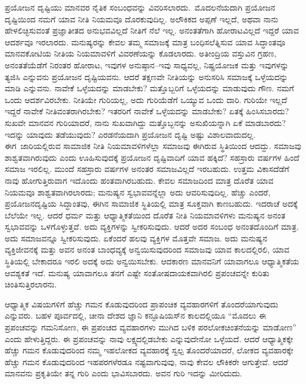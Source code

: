\vskip  0.2cm

ಪ್ರಯೋಜನ ದೃಷ್ಟಿಯು ಮಾನವರ ನೈತಿಕ ಸಂಬಂಧವನ್ನು ವಿವರಿಸಲಾರದು.\break\ ಮೊದಲನೆಯದಾಗಿ ಪ್ರಯೋಜನ ದೃಷ್ಟಿಯಿಂದ ನಮಗೆ ಯಾವ ನೀತಿ ನಿಯಮವೂ ದೊರಕುವುದಿಲ್ಲ. ಅಲೌಕಿಕದ ಅಪ್ಪಣೆ ಇಲ್ಲದೆ, ಅಥವಾ ನಾನು ಹೇಳಲಿಚ್ಛಿಸುವಂತೆ ಪ್ರಜ್ಞಾತೀತದ ಅನುಭವವಿಲ್ಲದೆ ನೀತಿಗೆ ನೆಲೆ ಇಲ್ಲ. ಅನಂತತೆಗಾಗಿ ಹೋರಾಟವಿಲ್ಲದೆ ಇದ್ದರೆ ಯಾವ ಆದರ್ಶವೂ ಇರಲಾರದು. ಮನುಷ್ಯರನ್ನು ಕೇವಲ ತಮ್ಮ ಸಮಾಜಕ್ಕೆ ಮಾತ್ರ ಬಂಧಿಸಲೆತ್ನಿಸುವ ಯಾವ ಸಿದ್ಧಾಂತವೂ ಮಾನವಕೋಟಿಯ ನೀತಿಯ ನಿಯಮಾವಳಿಗೆ ವಿವರಣೆಯನ್ನು ಕೊಡಲಾರದು. ಅತೀಂದ್ರಿಯ ವಸ್ತುವಿನ ಗ್ರಹಣ, ಅನಂತತೆಯೆಡೆಗೆ ನಿರಂತರ ಹೋರಾಟ, ಇವುಗಳ ಅನುಷ್ಠಾನ–ಇವು ಸಾಧ್ಯವಲ್ಲ, ನಿಷ್ಪ್ರಯೋಜಕ ಮತ್ತು ಇವುಗಳನ್ನು ತ್ಯಜಿಸಿ ಎನ್ನುವನು ಪ್ರಯೋಜನ ದೃಷ್ಟಿಯವನು. ಆದರೆ ತಕ್ಷಣವೇ ನೀತಿಯನ್ನು ಅನುಸರಿಸಿ ಸಮಾಜಕ್ಕೆ ಒಳ್ಳೆಯದನ್ನು ಮಾಡಿ ಎನ್ನುವನು. ನಾವೇಕೆ ಒಳ್ಳೆಯದನ್ನು ಮಾಡಬೇಕು? ಮತ್ತೊಬ್ಬರಿಗೆ ಒಳ್ಳೆಯದನ್ನು ಮಾಡುವುದು ಗೌಣ. ನಮಗೆ ಒಂದು ಆದರ್ಶವಿರಬೇಕು. ನೀತಿಯೇ ಗುರಿಯಲ್ಲ, ಅದು ಗುರಿಯೆಡೆಗೆ ಒಯ್ಯುವ ಒಂದು ದಾರಿ. ಗುರಿಯೇ ಇಲ್ಲದೆ ಇದ್ದರೆ ನಾವೇಕೆ ನೀತಿವಂತರಾಗಿರಬೇಕು? ಇತರರಿಗೆ ನಾವೇಕೆ ಒಳ್ಳೆಯದನ್ನು ಮಾಡಬೇಕು? ಏತಕ್ಕೆ ಹಿಂಸಿಸಬಾರದು? ಸುಖವೇ ಮಾನವನ ಗುರಿಯಾದರೆ, ನಾನು ಸುಖವಾಗಿದ್ದು ಮತ್ತೊಬ್ಬನನ್ನು ಅಸುಖಿಯನ್ನಾಗಿ ಏಕೆ ಮಾಡಬಾರದು? ಇದನ್ನು ಯಾವುದು ತಡೆಯುವುದು? ಎರಡನೆಯದಾಗಿ ಪ್ರಯೋಜನ ದೃಷ್ಟಿ ಅಷ್ಟು ವಿಶಾಲವಾದುದಲ್ಲ. ಈಗ\break\ ಜಾರಿಯಲ್ಲಿರುವ ಸಾಮಾಜಿಕ ನೀತಿ ನಿಯಮಾವಳಿಗಳೆಲ್ಲಾ ಸಮಾಜವು ಈಗಿರುವ ಸ್ಥಿತಿಯಿಂದ ಆದದ್ದು. ಸಮಾಜವು ಶಾಶ್ವತವಾಗಿರುವುದು ಎಂದು ಊಹಿಸುವುದಕ್ಕೆ  ಪ್ರಯೋಜನ ದೃಷ್ಟಿವಾದಿಗೆ ಯಾವ ಹಕ್ಕಿದೆ? ಸಹಸ್ರಾರು ವರ್ಷಗಳ ಹಿಂದೆ ಸಮಾಜ ಇರಲಿಲ್ಲ. ಮುಂದೆ ಸಹಸ್ರಾರು ವರ್ಷಗಳ ಅನಂತರ ಸಮಾಜವಿಲ್ಲದೆ ಇರಬಹುದು. ಉತ್ತಮ ವಿಕಾಸದೆಡೆಗೆ ನಾವು ಹೋಗುತ್ತಿರುವಾಗ ಇದೊಂದು ಹಂತವಾಗಿರಬಹುದು. ಕೇವಲ ಸಮಾಜದಿಂದ ಮಾತ್ರ ದೊರೆತ ಯಾವ ನಿಯಮವೂ ಶಾಶ್ವತವಾಗಿರಲಾರದು; ಮನುಷ್ಯನ ಸ್ವಭಾವವನ್ನೆಲ್ಲಾ ಅದು ಆವರಿಸುವುದಿಲ್ಲ. ಹೆಚ್ಚು ಎಂದರೆ, ಪ್ರಯೋಜನದೃಷ್ಟಿಯ ಸಿದ್ಧಾಂತವು, ಈಗಿನ ಸಾಮಾಜಿಕ ಸ್ಥಿತಿಯಲ್ಲಿ ಮಾತ್ರ ಸೂಕ್ತವಾಗಿ ಕಾಣಬಹುದು. ಇದರಾಚೆ ಅದಕ್ಕೆ ಬೆಲೆಯೇ ಇಲ್ಲ. ಆದರೆ ಧರ್ಮ ಮತ್ತು ಆಧ್ಯಾತ್ಮಿಕತೆಯಿಂದ ದೊರೆತ ನೀತಿ ನಿಯಮಾವಳಿಗಳು ಮನುಷ್ಯನ ಅನಂತ ಸ್ವಭಾವವನ್ನು ಒಳಗೊಳ್ಳುತ್ತವೆ. ಅದು ವ್ಯಕ್ತಿಗಳನ್ನು ಸ್ವೀಕರಿಸುವುದು. ಆದರೆ ಅದರ ಸಂಬಂಧ ಅನಂತದೊಂದಿಗೆ ಮಾತ್ರ. ಅದು ಸಮಾಜವನ್ನೂ ಸ್ವೀಕರಿಸುವುದು. ಏಕೆಂದರೆ ಹಲವು ವ್ಯಕ್ತಿಗಳ ಮೊತ್ತವೇ ಸಮಾಜ. ಅದು ಮನುಷ್ಯನ ವ್ಯಕ್ತಿಜೀವನಕ್ಕೆ ಮತ್ತು ಅವನ ಅನಂತ ಬಾಂಧವ್ಯಕ್ಕೆ ಅನ್ವಯಿಸುವುದರಿಂದ ಸಮಾಜವು ಯಾವ ಕಾಲದಲ್ಲಿರಲಿ, ಯಾವ ಸ್ಥಿತಿಯಲ್ಲಿ ಬೇಕಾದರೂ ಇರಲಿ ಅದಕ್ಕೆ ಅದು ಅನ್ವಯಿಸಬೇಕು. ಆದಕಾರಣ ಮಾನವನಿಗೆ ಯಾವಾಗಲೂ ಆಧ್ಯಾತ್ಮಿಕತೆಯ ಆವಶ್ಯಕತೆ ಇದೆ. ಮನುಷ್ಯ ಯಾವಾಗಲೂ ತನಗೆ ಎಷ್ಟೇ ಸಂತೋಷದಾಯಕವಾಗಿರಲಿ ಪ್ರಪಂಚವನ್ನೇ ಕುರಿತು ಚಿಂತಿಸುತ್ತಿರಲಾರನು.

ಆಧ್ಯಾತ್ಮಿಕ ವಿಷಯಗಳಿಗೆ ಹೆಚ್ಚು ಗಮನ ಕೊಡುವುದರಿಂದ ಪ್ರಾಪಂಚಿಕ ವ್ಯವಹಾರಗಳಿಗೆ ತೊಂದರೆಯಾಗುವುದು ಎನ್ನುವರು. ಬಹಳ ಪೂರ್ವದಲ್ಲಿ, ಚೀನಾ ದೇಶದ ಜ್ಞಾನಿ ಕನ್ಫೂಷಿಯಸ್​ನ ಕಾಲದಲ್ಲಿಯೂ “ಮೊದಲು ಈ ಪ್ರಪಂಚವನ್ನು ಗಮನಿಸೋಣ, ಈ ಪ್ರಪಂಚದ ವ್ಯವಹಾರಗಳು ಮುಗಿದ ಬಳಿಕ ಪರಲೋಕಚಿಂತನೆಯನ್ನು ಮಾಡೋಣ” ಎಂದು ಹೇಳುತ್ತಿದ್ದರು. ಈ ಪ್ರಪಂಚವನ್ನು ನಾವು ಲಕ್ಷ್ಯದಲ್ಲಿಡಬೇಕು ಎನ್ನುವುದೇನೋ ಒಳ್ಳೆಯದೆ. ಆದರೆ ಆಧ್ಯಾತ್ಮಿಕಕ್ಕೇ ಹೆಚ್ಚು ಗಮನ ಕೊಡುವುದರಿಂದ ನಮ್ಮ ಇಹಲೋಕದ ವ್ಯವಹಾರಕ್ಕೆ ಸ್ವಲ್ಪ ತೊಂದರೆಯಾದರೆ, ಲೋಕದ ವ್ಯವಹಾರಕ್ಕೇ ಹೆಚ್ಚು ಗಮನ ಕೊಡುವುದರಿಂದ ಇಹಪರಗಳೆರಡೂ ನಷ್ಟವಾಗುವುವು, ನಾವು ಕೇವಲ ಲೌಕಿಕರೇ ಆಗುತ್ತೇವೆ. ಆದರೆ ಮಾನವನು ಪ್ರಕೃತಿಯೇ ತನ್ನ ಗುರಿ ಎಂದು ಭಾವಿಸಬಾರದು. ಅವನ ಗುರಿ ಇದನ್ನು ಮೀರಿದುದು.

